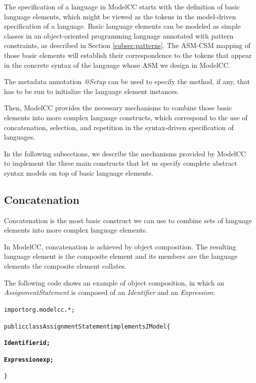 \documentclass[a4paper,twoside,onecolumn]{article}
\newenvironment{colframe}{%
  \begin{Sbox} 
    \begin{minipage}{.8\columnwidth} 
}{%

  \end{minipage} 
  \end{Sbox} 
  \begin{center} 
    \fcolorbox{black}{MyGray}{\TheSbox} 
  \end{center} 
}
\begin{document}
The specification of a language in ModelCC starts with the definition of basic language elements, which might be viewed as the tokens in the model-driven specification of a language.
Basic language elements can be modeled as simple classes in an object-oriented programming language annotated with pattern constraints, as described in Section \ref{subsec:patterns}.
The ASM-CSM mapping of those basic elements will establish their correspondence to the tokens that appear in the concrete syntax of the language whose ASM we design in ModelCC.

The metadata annotation \emph{@Setup} can be used to specify the method, if any, that has to be run to initialize the language element instances.

Then, ModelCC provides the necessary mechanisms to combine those basic elements into more complex language constructs, which correspond to the use of concatenation, selection, and repetition in the syntax-driven specification of languages.

In the following subsections, we describe the mechanisms provided by ModelCC to implement the three main constructs that let us specify complete abstract syntax models on top of basic
language elements.

\subsection{Concatenation}

Concatenation is the most basic construct we can use to combine sets of language elements into more complex language elements.

In ModelCC, concatenation is achieved by object composition. The resulting language element is the composite element and its members are the language elements the composite element collates.

The following code shows an example of object composition, in which an \emph{AssignmentStatement} is composed of an \emph{Identifier} and an \emph{Expression}:

\begin{colframe}
\begin{alltt}
import org.modelcc.*;

public class AssignmentStatement implements{\emph IModel} \{

  {\bf Identifier id;}

  {\bf Expression exp;}

\}
\end{alltt}
\end{colframe}
\end{document}
